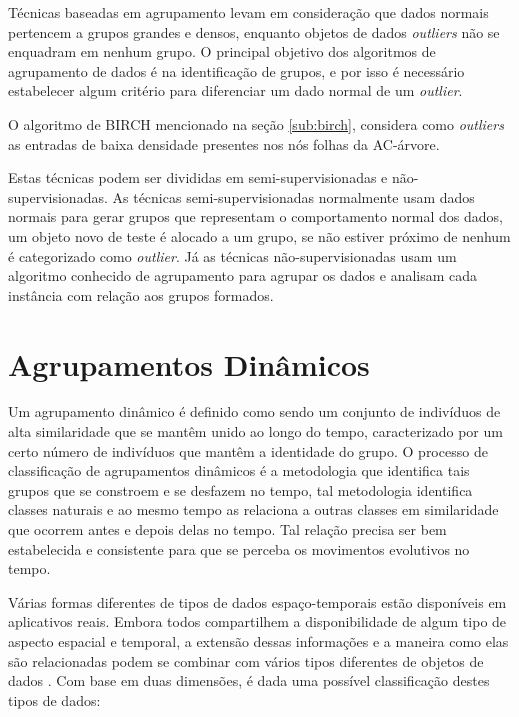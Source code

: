 Técnicas baseadas em agrupamento levam em consideração que dados normais pertencem a grupos grandes e densos, enquanto objetos de dados \textit{outliers} não se enquadram em nenhum grupo. O principal objetivo dos algoritmos de agrupamento de dados é na identificação de grupos, e por isso é necessário estabelecer algum critério para diferenciar um dado normal de um \textit{outlier}.

O algoritmo de BIRCH \cite{Zhang1996} mencionado na seção \ref{sub:birch}, considera como \textit{outliers} as entradas de baixa densidade presentes nos nós folhas da AC-árvore.

Estas técnicas podem ser divididas em semi-supervisionadas e não-supervisionadas. As técnicas semi-supervisionadas normalmente usam dados normais para gerar grupos que representam o comportamento normal dos dados, um objeto novo de teste é alocado a um grupo, se não estiver próximo de nenhum é categorizado como \textit{outlier}. Já as técnicas não-supervisionadas usam um algoritmo conhecido de agrupamento para agrupar os dados e analisam cada instância com relação aos grupos formados.

\section{Agrupamentos Dinâmicos}
Um agrupamento dinâmico é definido como sendo um conjunto de indivíduos de alta similaridade que se mantêm unido ao longo do tempo, caracterizado por um certo número de indivíduos que mantêm a identidade do grupo. O processo de classificação de agrupamentos dinâmicos é a metodologia que identifica tais grupos que se constroem e se desfazem no tempo, tal metodologia identifica classes naturais e ao mesmo tempo as relaciona a outras classes em similaridade que ocorrem antes e depois delas no tempo. Tal relação precisa ser bem estabelecida e consistente para que se perceba os movimentos evolutivos no tempo.

Várias formas diferentes de tipos de dados espaço-temporais estão disponíveis em aplicativos reais. Embora todos compartilhem a disponibilidade de algum tipo de aspecto espacial e temporal, a extensão dessas informações e a maneira como elas são relacionadas podem se combinar com vários tipos diferentes de objetos de dados \cite{maimon:2005}. Com base em duas dimensões, é dada uma possível classificação destes tipos de dados:

